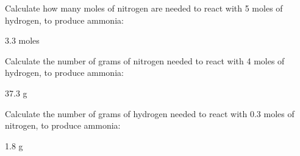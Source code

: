 \documentclass[main.tex]{subfiles}
\begin{document}
\begin{multicols*}{2}
\begin{question}[ID=\the\value{numA}]
Calculate how many moles of nitrogen are needed to react with 5 moles of hydrogen, to produce ammonia:
\begin{center}  \end{center}
\end{question}
\begin{solution}
3.3 moles
\hspace{0.1cm}\end{solution}%
\begin{question}[ID=\the\value{numA}]
Calculate the number of grams of nitrogen needed to react with 4 moles of hydrogen, to produce ammonia:
\begin{center}  \end{center}
\end{question}
\begin{solution}
37.3 g
\hspace{0.1cm}\end{solution}%
\begin{question}[ID=\the\value{numA}]
Calculate the number of grams of hydrogen needed to react with 0.3 moles of nitrogen, to produce ammonia:
\begin{center}  \end{center}
\end{question}
\begin{solution}
1.8 g
\hspace{0.1cm}\end{solution}%


\end{multicols*}
\end{document}
